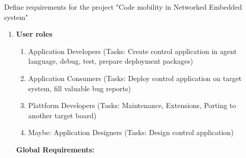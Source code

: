\documentclass{scrreprt}
\begin{document}
Define requirements for the project "Code mobility in Networked Embedded system"

\renewcommand{\labelenumi}{\arabic{enumi}}
\renewcommand{\labelenumii}{\arabic{enumi}.\arabic{enumii}}

\begin{enumerate}

\item\textbf{User roles}
\begin{enumerate}

\item Application Developers (Tasks: Create control application in agent language, debug, test, prepare deployment packages)
\item Application Consumers  (Tasks: Deploy control application on target system, fill valuable bug reports)
\item Plattform Developers (Tasks: Maintenance, Extensions, Porting to another target board)
\item Maybe: Application Designers (Tasks: Design control application)
\end{enumerate}


\textbf{
Global Requirements:
}



\end{enumerate}
\end{document}
